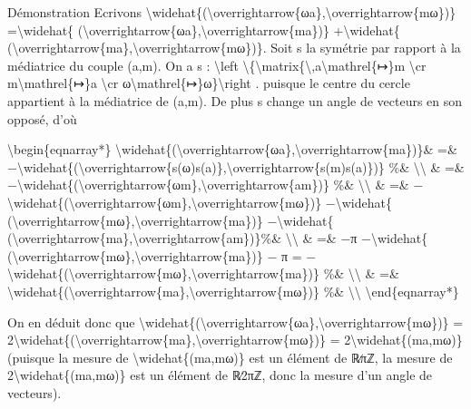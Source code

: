 \documentclass[]{article}
\begin{document}
Démonstration Ecrivons
\textbackslash{}widehat\{(\textbackslash{}overrightarrow\{ωa\},\textbackslash{}overrightarrow\{mω\})\}
=\textbackslash{}widehat\{
(\textbackslash{}overrightarrow\{ωa\},\textbackslash{}overrightarrow\{ma\})\}
+\textbackslash{}widehat\{
(\textbackslash{}overrightarrow\{ma\},\textbackslash{}overrightarrow\{mω\})\}.
Soit s la symétrie par rapport à la médiatrice du couple (a,m). On a s :
\textbackslash{}left
\textbackslash{}\{\textbackslash{}matrix\{\textbackslash{},a\textbackslash{}mathrel\{↦\}m
\textbackslash{}cr m\textbackslash{}mathrel\{↦\}a \textbackslash{}cr
ω\textbackslash{}mathrel\{↦\}ω\}\textbackslash{}right . puisque le
centre du cercle appartient à la médiatrice de (a,m). De plus s change
un angle de vecteurs en son opposé, d'où

\textbackslash{}begin\{eqnarray*\}
\textbackslash{}widehat\{(\textbackslash{}overrightarrow\{ωa\},\textbackslash{}overrightarrow\{ma\})\}\&
=\&
−\textbackslash{}widehat\{(\textbackslash{}overrightarrow\{s(ω)s(a)\},\textbackslash{}overrightarrow\{s(m)s(a)\})\}
\%\& \textbackslash{}\textbackslash{} \& =\&
−\textbackslash{}widehat\{(\textbackslash{}overrightarrow\{ωm\},\textbackslash{}overrightarrow\{am\})\}
\%\& \textbackslash{}\textbackslash{} \& =\&
−\textbackslash{}widehat\{(\textbackslash{}overrightarrow\{ωm\},\textbackslash{}overrightarrow\{mω\})\}
−\textbackslash{}widehat\{
(\textbackslash{}overrightarrow\{mω\},\textbackslash{}overrightarrow\{ma\})\}
−\textbackslash{}widehat\{
(\textbackslash{}overrightarrow\{ma\},\textbackslash{}overrightarrow\{am\})\}\%\&
\textbackslash{}\textbackslash{} \& =\& −π −\textbackslash{}widehat\{
(\textbackslash{}overrightarrow\{mω\},\textbackslash{}overrightarrow\{ma\})\}
− π =
−\textbackslash{}widehat\{(\textbackslash{}overrightarrow\{mω\},\textbackslash{}overrightarrow\{ma\})\}
\%\& \textbackslash{}\textbackslash{} \& =\&
\textbackslash{}widehat\{(\textbackslash{}overrightarrow\{ma\},\textbackslash{}overrightarrow\{mω\})\}
\%\& \textbackslash{}\textbackslash{} \textbackslash{}end\{eqnarray*\}

On en déduit donc que
\textbackslash{}widehat\{(\textbackslash{}overrightarrow\{ωa\},\textbackslash{}overrightarrow\{mω\})\}
=
2\textbackslash{}widehat\{(\textbackslash{}overrightarrow\{ma\},\textbackslash{}overrightarrow\{mω\})\}
= 2\textbackslash{}widehat\{(ma,mω)\} (puisque la mesure de
\textbackslash{}widehat\{(ma,mω)\} est un élément de ℝ∕πℤ, la mesure de
2\textbackslash{}widehat\{(ma,mω)\} est un élément de ℝ∕2πℤ, donc la
mesure d'un angle de vecteurs).
\end{document}
